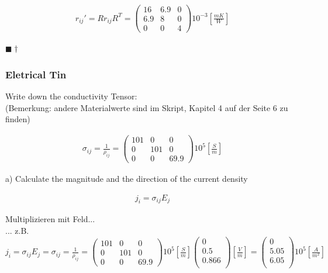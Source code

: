 \documentclass[a4paper]{scrartcl}
\newcommand{\qed}{\begin{flushright}
$\blacksquare \dagger$ \end{flushright}}
\begin{document}
\begin{align}
r_{ij}'=Rr_{ij}R^{T} = \begin{pmatrix}
16 & 6.9 & 0 \\
6.9 & 8 & 0 \\
0 & 0 & 4
\end{pmatrix}
10^{-3}[\frac{mK}{W}] 
\end{align}
\qed




\subsubsection{Eletrical Tin}
Write down the conductivity Tensor:\\
(Bemerkung: andere Materialwerte sind im Skript, Kapitel 4 auf der Seite 6 zu finden)

\begin{align}
\sigma_{ij} = \frac{1}{\rho_{ij}}= \begin{pmatrix}
101 & 0 & 0 \\
0 & 101 & 0 \\
0 & 0 & 69.9 
\end{pmatrix}
10^5 [\frac{S}{m}]
\end{align}



a) Calculate the magnitude and the direction of the current density

\begin{align}
j_i=\sigma_{ij}E_j
\end{align}

Multiplizieren mit Feld...
\\... z.B. $ j_i=\sigma_{ij}E_j = \sigma_{ij} = \frac{1}{\rho_{ij}}= \begin{pmatrix}
101 & 0 & 0 \\
0 & 101 & 0 \\
0 & 0 & 69.9 
\end{pmatrix} 10^5 [\frac{S}{m}] 
\begin{pmatrix}
0 \\
0.5 \\
0.866 \\
\end{pmatrix} [\frac{V}{m}] = 
\begin{pmatrix}
0 \\
5.05 \\
6.05 \\
\end{pmatrix} 10^5 [\frac{A}{m^2}]$
\end{document}
